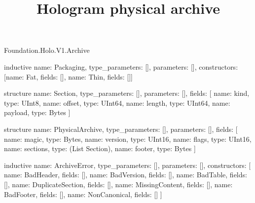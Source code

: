 \begin{lexlean}{Foundation.Holo.V1.Archive}
\title{Hologram physical archive}
\begin{semanticmodule}
inductive{
  name: Packaging,
  type_parameters: [],
  parameters: [],
  constructors: [{name: Fat, fields: []}, {name: Thin, fields: []}]
}

structure{
  name: Section,
  type_parameters: [],
  parameters: [],
  fields: [
    {name: kind, type: UInt8},
    {name: offset, type: UInt64},
    {name: length, type: UInt64},
    {name: payload, type: Bytes}
  ]
}

structure{
  name: PhysicalArchive,
  type_parameters: [],
  parameters: [],
  fields: [
    {name: magic, type: Bytes},
    {name: version, type: UInt16},
    {name: flags, type: UInt16},
    {name: sections, type: (List Section)},
    {name: footer, type: Bytes}
  ]
}

inductive{
  name: ArchiveError,
  type_parameters: [],
  parameters: [],
  constructors: [
    {name: BadHeader, fields: []},
    {name: BadVersion, fields: []},
    {name: BadTable, fields: []},
    {name: DuplicateSection, fields: []},
    {name: MissingContent, fields: []},
    {name: BadFooter, fields: []},
    {name: NonCanonical, fields: []}
  ]
}
\end{semanticmodule}
\end{lexlean}
